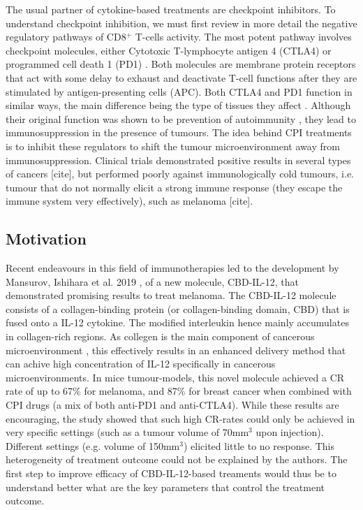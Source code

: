 \documentclass[11pt]{article}
\begin{document}
The usual partner of cytokine-based treatments are checkpoint inhibitors. To understand checkpoint inhibition, we must first review in more detail the negative regulatory pathways of CD8$^+$ T-cells activity. The most potent pathway involves checkpoint molecules, either Cytotoxic T-lymphocyte antigen 4 (CTLA4) or programmed cell death 1 (PD1) \cite{cpiProof}. Both molecules are membrane protein receptors that act with some delay to exhaust and deactivate T-cell functions after they are stimulated by antigen-presenting cells (APC). Both CTLA4 and PD1 function in similar ways, the main difference being the type of tissues they affect \cite{PDvsCTLA}. Although their original function was shown to be prevention of autoimmunity \cite{PD1Autoimmune}, they lead to immunosuppression in the presence of tumours. The idea behind CPI treatments is to inhibit these regulators to shift the tumour microenvironment away from immunosuppression. Clinical trials demonstrated positive results in several types of cancers [cite], but performed poorly against immunologically cold tumours, i.e. tumour that do not normally elicit a strong immune response (they escape the immune system very effectively), such as melanoma [cite].

\subsection{Motivation}
\par Recent endeavours in this field of immunotherapies led to the development by Mansurov, Ishihara et al. 2019 \cite{cbdil12}, of a new molecule, CBD-IL-12, that demonstrated promising results to treat melanoma. The CBD-IL-12  molecule consists of a collagen-binding protein (or collagen-binding domain, CBD) that is fused onto a IL-12 cytokine. The modified interleukin hence mainly accumulates in collagen-rich regions. As collegen is the main component of cancerous microenvironment \cite{collagenInCancer}, this effectively results in an enhanced delivery method that can achive high concentration of IL-12 specifically in cancerous microenvironments. In mice tumour-models, this novel molecule achieved a CR rate of up to 67\% for melanoma, and 87\% for breast cancer when combined with CPI drugs (a mix of both anti-PD1 and anti-CTLA4). While these results are encouraging, the study showed that such high CR-rates could only be achieved in very specific settings (such as a tumour volume of 70mm$^3$ upon injection). Different settings (e.g. volume of 150mm$^3$) elicited little to no response. This heterogeneity of treatment outcome could not be explained by the authors. The first step to improve efficacy of CBD-IL-12-based treaments would thus be to understand better what are the key parameters that control the treatment outcome. 
\end{document}
